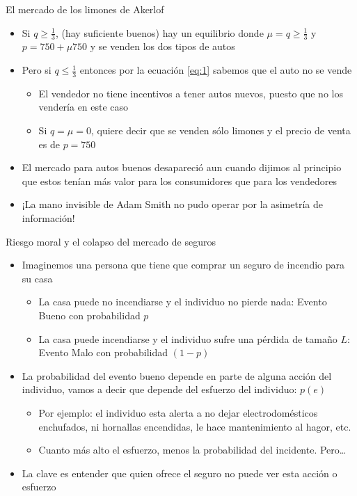\documentclass{beamer}
\begin{document}
\begin{frame}{El mercado de los limones de Akerlof}
\begin{itemize}
    \item  Si $ q \geq \frac{1}{3}$, (hay suficiente buenos) hay un equilibrio donde $\mu = q \geq \frac{1}{3}$ y $p= 750 + \mu 750$ y se venden los dos tipos de autos 
    \vspace{1mm}
    \item Pero si $q \leq \frac{1}{3}$ entonces por la ecuación \eqref{eq:1} sabemos que el auto no se vende
    \begin{itemize}
    \item El vendedor no tiene incentivos a tener autos nuevos, puesto que no los vendería en este caso
    \item Si $q= \mu = 0 $, quiere decir que se venden sólo limones y el precio de venta es de $p= 750$ 
    \end{itemize}
    \item El mercado para autos buenos desapareció aun cuando dijimos al principio que estos tenían más valor para los consumidores que para los vendedores \vspace{1mm}
    \item ¡La mano invisible de Adam Smith no pudo operar por la asimetría de información!
\end{itemize} 
\end{frame}

\begin{frame}{Riesgo moral y el colapso del mercado de seguros}
    \begin{itemize}
        \item Imaginemos una persona que tiene que comprar un seguro de incendio para su casa
        \begin{itemize}
            \item La casa puede no incendiarse y el individuo no pierde nada: Evento Bueno con probabilidad $p$
            \item La casa puede incendiarse y el individuo sufre una pérdida de tamaño $L$: Evento Malo con probabilidad $(1-p)$ 
        \end{itemize}
        \item La probabilidad del evento bueno depende en parte de alguna acción del individuo, vamos a decir que depende del esfuerzo del individuo: $p(e)$
        \begin{itemize}
            \item Por ejemplo: el individuo esta alerta a no dejar electrodomésticos enchufados, ni hornallas encendidas, le hace mantenimiento al hagor, etc.
            \item Cuanto más alto el esfuerzo, menos la probabilidad del incidente. Pero\dots
        \end{itemize}
        \item La clave es entender que quien ofrece el seguro no puede ver esta acción o esfuerzo
    \end{itemize}
\end{frame}
\end{document}
